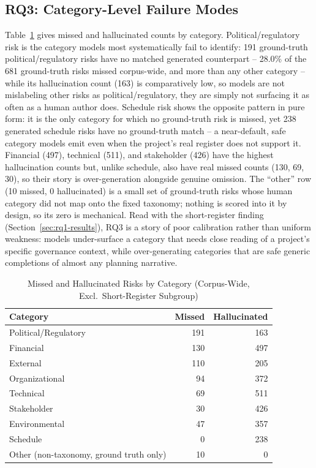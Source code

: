 \documentclass[10pt, conference, letterpaper]{IEEEtran}
\begin{document}
\subsection{RQ3: Category-Level Failure Modes}
\label{sec:rq3-results}
Table~\ref{tab:rq3} gives missed and hallucinated counts by category.
Political/regulatory risk is the category models most systematically fail
to identify: 191 ground-truth political/regulatory risks have no matched
generated counterpart -- 28.0\% of the 681 ground-truth risks missed
corpus-wide, and more than any other category -- while its hallucination
count (163) is comparatively low, so models are not mislabeling other risks
as political/regulatory, they are simply not surfacing it as often as a
human author does. Schedule risk shows the opposite pattern in pure form:
it is the only category for which no ground-truth risk is missed, yet 238
generated schedule risks have no ground-truth match -- a near-default, safe
category models emit even when the project's real register does not support
it. Financial (497), technical (511), and
stakeholder (426) have the highest hallucination counts but, unlike
schedule, also have real missed counts (130, 69, 30), so their story is
over-generation alongside genuine omission. The ``other'' row (10 missed, 0
hallucinated) is a small set of ground-truth risks whose human category did
not map onto the fixed taxonomy; nothing is scored into it by design, so
its zero is mechanical. Read with the short-register finding
(Section~\ref{sec:rq1-results}), RQ3 is a story of poor calibration rather
than uniform weakness: models under-surface a category that needs close
reading of a project's specific governance context, while over-generating
categories that are safe generic completions of almost any planning
narrative.

\begin{table}[t]
\caption{Missed and Hallucinated Risks by Category (Corpus-Wide, Excl.\ Short-Register Subgroup)}
\label{tab:rq3}
\small
\begin{tabular}{@{}p{}rr@{}}
\toprule
\textbf{Category} & \textbf{Missed} & \textbf{Hallucinated} \\
\midrule
Political/Regulatory & 191 & 163 \\
Financial & 130 & 497 \\
External & 110 & 205 \\
Organizational & 94 & 372 \\
Technical & 69 & 511 \\
Stakeholder & 30 & 426 \\
Environmental & 47 & 357 \\
Schedule & 0 & 238 \\
Other (non-taxonomy, ground truth only) & 10 & 0 \\
\bottomrule
\end{tabular}
\end{table}
\end{document}
